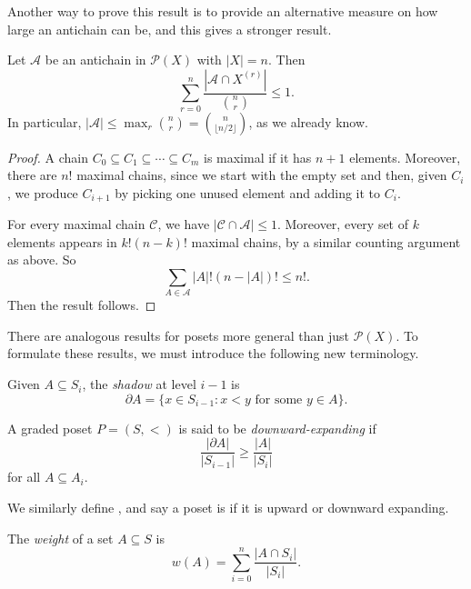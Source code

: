 \documentclass[a4paper]{article}
\begin{document}
Another way to prove this result is to provide an alternative measure on how large an antichain can be, and this gives a stronger result.
\begin{thm}
  Let $\mathcal{A}$ be an antichain in $\mathcal{P}(X)$ with $|X| = n$. Then
  \[
    \sum_{r = 0}^n \frac{|\mathcal{A} \cap X^{(r)}|}{\binom{n}{r}} \leq 1.
  \]
  In particular, $|\mathcal{A}| \leq \max_r \binom{n}{r} = \binom{n}{\lfloor n/2\rfloor}$, as we already know.
\end{thm}

\begin{proof}
  A chain $C_0 \subseteq C_1 \subseteq \cdots \subseteq C_m$ is maximal if it has $n + 1$ elements. Moreover, there are $n!$ maximal chains, since we start with the empty set and then, given $C_i$, we produce $C_{i + 1}$ by picking one unused element and adding it to $C_i$.

  For every maximal chain $\mathcal{C}$, we have $|\mathcal{C} \cap \mathcal{A}| \leq 1$. Moreover, every set of $k$ elements appears in $k! (n - k)!$ maximal chains, by a similar counting argument as above. So
  \[
    \sum_{A \in \mathcal{A}} |A|! (n - |A|)! \leq n!.
  \]
  Then the result follows.
\end{proof}

There are analogous results for posets more general than just $\mathcal{P}(X)$. To formulate these results, we must introduce the following new terminology.
\begin{defi}[Shadow]
  Given $A \subseteq S_i$, the \emph{shadow} at level $i - 1$ is
  \[
    \partial A = \{x \in S_{i - 1}: x < y\text{ for some }y \in A\}.
  \]
\end{defi}

\begin{defi}
  A graded poset $P = (S, <)$ is said to be \emph{downward-expanding} if
  \[
    \frac{|\partial A|}{|S_{i - 1}|} \geq \frac{|A|}{|S_i|}
  \]
  for all $A \subseteq A_i$.

  We similarly define , and say a poset is  if it is upward or downward expanding.
\end{defi}

\begin{defi}[Weight]
  The \emph{weight} of a set $A \subseteq S$ is
  \[
    w(A) = \sum_{i = 0}^n \frac{|A \cap S_i|}{|S_i|}.
  \]
\end{defi}
\end{document}
